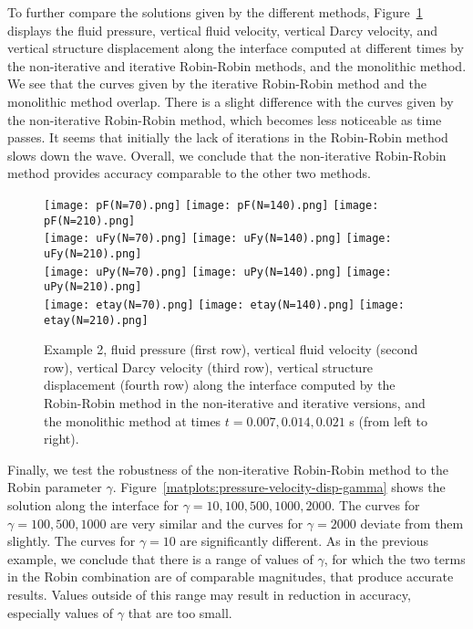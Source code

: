 \documentclass[11pt]{article}
\begin{document}
To further compare the solutions given by the different methods, Figure~\ref{matplots:pressure-velocity-disp} displays the fluid pressure, vertical fluid velocity,
vertical Darcy velocity, and vertical structure
displacement along the interface computed at different times
by the non-iterative and iterative Robin-Robin methods, and the monolithic method. We see that the curves given by the iterative Robin-Robin method and the monolithic method
overlap. There is a slight difference with the curves given by the non-iterative Robin-Robin method, which becomes less noticeable as time passes. It seems that initially the lack of iterations in the Robin-Robin method slows down the wave. Overall, we conclude that the non-iterative Robin-Robin method provides accuracy comparable to the other two methods.

\begin{figure}[ht!]
\begin{center}
\texttt{[image: pF(N=70).png]}
\texttt{[image: pF(N=140).png]}
\texttt{[image: pF(N=210).png]}\\
\texttt{[image: uFy(N=70).png]}
\texttt{[image: uFy(N=140).png]}
\texttt{[image: uFy(N=210).png]}\\
\texttt{[image: uPy(N=70).png]}
\texttt{[image: uPy(N=140).png]}
\texttt{[image: uPy(N=210).png]}\\
\texttt{[image: etay(N=70).png]}
\texttt{[image: etay(N=140).png]}
\texttt{[image: etay(N=210).png]}
\end{center}
\caption{Example 2, fluid pressure (first row), vertical fluid velocity (second row),
vertical Darcy velocity (third row), vertical structure
displacement (fourth row) along the interface computed by the Robin-Robin method in the non-iterative and iterative versions, and the monolithic method
at times $t= 0.007, 0.014, 0.021$ s (from left to right).}\label{matplots:pressure-velocity-disp}
\end{figure}

Finally, we test the robustness of the non-iterative Robin-Robin method to the Robin parameter $\gamma$. Figure~\ref{matplots:pressure-velocity-disp-gamma} shows the solution along the interface for $\gamma = 10, 100, 500, 1000, 2000$. The curves for $\gamma = 100, 500, 1000$ are very similar and the curves for $\gamma = 2000$ deviate from them slightly. The curves for $\gamma = 10$ are significantly different. As in the previous example, we conclude that there is a range of values of $\gamma$, for which the two terms in the Robin combination are of comparable magnitudes, that produce accurate results. Values outside of this range may result in reduction in accuracy, especially values of $\gamma$ that are too small. 
\end{document}

